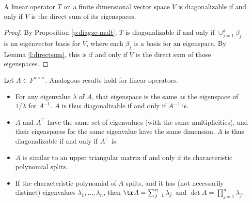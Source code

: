 \begin{prop}\label{p:sum-espace}
A linear operator $T$ on a finite dimensional vector space $V$ is diagonalizable if and only if $V$ is the direct sum of its eigenspaces.
\end{prop}
\begin{proof}%
By Proposition \ref{p:diagze-mult}, $T$ is diagonalizable if and only if $\cup_{j=1}^k \beta_j$ is an eigenvector basis for $V$, where each $\beta_j$ is a basis for an eigenspace. By Lemma \ref{l:directsum}, this is if and only if $V$ is the direct sum of those eigenspaces.
\end{proof}
\begin{exer}\label{e:split-ut}
Let $A \in F^{n \times n}$. Analogous results hold for linear operators.
\begin{itemize}
\item For any eigenvalue $\lambda$ of $A$, that eigenspace is the same as the eigenspace of $1/ \lambda$ for $A^{-1}$. $A$ is thus diagonalizable if and only if $A^{-1}$ is.
\item $A$ and $A^\top$ have the same set of eigenvalues (with the same multiplicities), and their eigenspaces for the same eigenvalue have the same dimension. $A$ is thus diagonalizable if and only if $A^\top$ is.
\item $A$ is similar to an upper triangular matrix if and only if its characteristic polynomial splits.
\item If the characteristic polynomial of $A$ splits, and it has (not necessarily distinct) eigenvalues $\lambda_1, \ldots, \lambda_n$, then $\tr A= \sum_{j=1}^n \lambda_j$ and $\det A= \prod_{j=1}^n \lambda_j$.
\end{itemize}
\end{exer}
